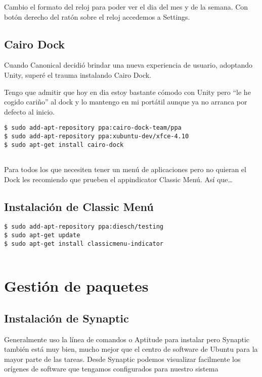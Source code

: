 Cambio el formato del reloj para poder ver el dia del mes y de la
semana. Con botón derecho del ratón sobre el reloj accedemos a Settings.

\subsection{Cairo Dock}\label{cairo-dock}

Cuando Canonical decidió brindar una nueva experiencia de usuario,
adoptando Unity, superé el trauma instalando Cairo Dock.

Tengo que admitir que hoy en dia estoy bastante cómodo con Unity pero
``le he cogido cariño'' al dock y lo mantengo en mi portátil aunque ya
no arranca por defecto al inicio.

\begin{verbatim}
$ sudo add-apt-repository ppa:cairo-dock-team/ppa
$ sudo add-apt-repository ppa:xubuntu-dev/xfce-4.10
$ sudo apt-get install cairo-dock
      
\end{verbatim}

Para todos los que necesiten tener un menú de aplicaciones pero no
quieran el Dock les recomiendo que prueben el appindicator Classic Menú.
Así que\ldots{}

\subsection{Instalación de Classic
Menú}\label{instalaciuxf3n-de-classic-menuxfa}

\begin{verbatim}
$ sudo add-apt-repository ppa:diesch/testing
$ sudo apt-get update
$ sudo apt-get install classicmenu-indicator
      
\end{verbatim}

\section{Gestión de paquetes}\label{gestiuxf3n-de-paquetes}

\subsection{Instalación de Synaptic}\label{instalaciuxf3n-de-synaptic}

Generalmente uso la línea de comandos o Aptitude para instalar pero
Synaptic también está muy bien, mucho mejor que el centro de software de
Ubuntu para la mayor parte de las tareas. Desde Synaptic podemos
visualizar facilmente los orígenes de software que tengamos configurados
para nuestro sistema

